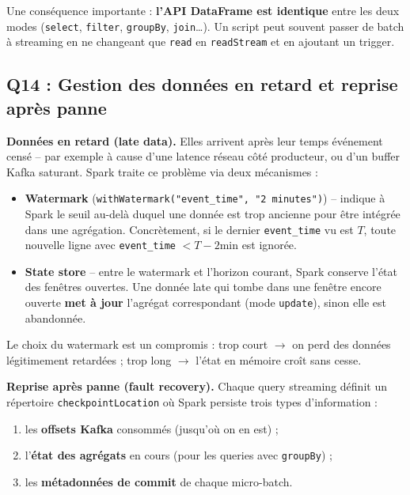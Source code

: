 \documentclass{RapportINPTCLOUD}
\begin{document}
Une cons\'{e}quence importante : \textbf{l'API DataFrame est identique} entre les deux modes (\texttt{select}, \texttt{filter}, \texttt{groupBy}, \texttt{join}\dots). Un script peut souvent passer de batch \`{a} streaming en ne changeant que \texttt{read} en \texttt{readStream} et en ajoutant un trigger.

\subsection{Q14 : Gestion des donn\'{e}es en retard et reprise apr\`{e}s panne}

\textbf{Donn\'{e}es en retard (late data).} Elles arrivent apr\`{e}s leur temps \'{e}v\'{e}nement cens\'{e} -- par exemple \`{a} cause d'une latence r\'{e}seau c\^{o}t\'{e} producteur, ou d'un buffer Kafka saturant. Spark traite ce probl\`{e}me via deux m\'{e}canismes :
\begin{itemize}[leftmargin=2em]
    \item \textbf{Watermark} (\texttt{withWatermark("event\_time", "2 minutes")}) -- indique \`{a} Spark le seuil au-del\`{a} duquel une donn\'{e}e est trop ancienne pour \^{e}tre int\'{e}gr\'{e}e dans une agr\'{e}gation. Concr\`{e}tement, si le dernier \texttt{event\_time} vu est $T$, toute nouvelle ligne avec \texttt{event\_time} $< T - 2\text{min}$ est ignor\'{e}e.
    \item \textbf{State store} -- entre le watermark et l'horizon courant, Spark conserve l'\'{e}tat des fen\^{e}tres ouvertes. Une donn\'{e}e late qui tombe dans une fen\^{e}tre encore ouverte \textbf{met \`{a} jour} l'agr\'{e}gat correspondant (mode \texttt{update}), sinon elle est abandonn\'{e}e.
\end{itemize}

Le choix du watermark est un compromis : trop court $\rightarrow$ on perd des donn\'{e}es l\'{e}gitimement retard\'{e}es ; trop long $\rightarrow$ l'\'{e}tat en m\'{e}moire cro\^{i}t sans cesse.

\textbf{Reprise apr\`{e}s panne (fault recovery).} Chaque query streaming d\'{e}finit un r\'{e}pertoire \texttt{checkpointLocation} o\`{u} Spark persiste trois types d'information :
\begin{enumerate}[leftmargin=2em]
    \item les \textbf{offsets Kafka} consomm\'{e}s (jusqu'o\`{u} on en est) ;
    \item l'\textbf{\'{e}tat des agr\'{e}gats} en cours (pour les queries avec \texttt{groupBy}) ;
    \item les \textbf{m\'{e}tadonn\'{e}es de commit} de chaque micro-batch.
\end{enumerate}
\end{document}
